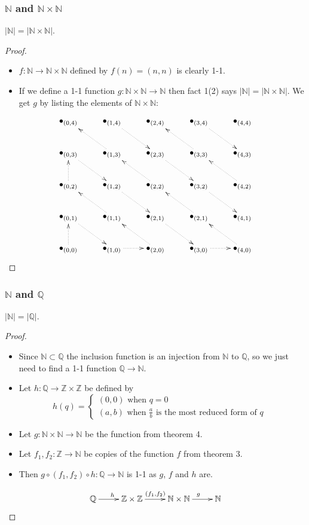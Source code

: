 \documentclass[handout]{beamer}
\newcommand{\bN}{\mathbb{N}}
\newcommand{\bZ}{\mathbb{Z}}
\newcommand{\bQ}{\mathbb{Q}}
\begin{document}
\begin{frame}
\frametitle{$\bN$ and $\bN\times \bN$}
\begin{theorem}
$|\bN|=|\bN\times\bN|$.
\end{theorem}
\begin{proof}
\begin{itemize}
\item $f:\bN\to\bN\times\bN$ defined by $f(n)=(n,n)$ is clearly 1-1. 
\item If we define a 1-1 function $g:\bN\times \bN\to \bN$ then fact 1(2) says $|\bN|=|\bN\times\bN|$. We get $g$ by listing the elements of $\bN\times \bN$: 
\end{itemize}
\xymatrixrowsep{.3cm}
\xymatrixcolsep{.3cm}
\[\xymatrix{ 
\bullet_{(0,4)} & \bullet_{(1,4)}\ar@{.>}[dr] & \bullet_{(2,4)} & \bullet_{(3,4)}\ar@{.>}[dr] & \bullet_{(4,4)}\\
\bullet_{(0,3)}\ar@{.>}[dr]  & \bullet_{(1,3)}\ar@{.>}[ul] & \bullet_{(2,3)}\ar@{.>}[dr]  & \bullet_{(3,3)}\ar@{.>}[ul] & \bullet_{(4,3)} \\
\bullet_{(0,2)}\ar@{.>}[u]  & \bullet_{(1,2)}\ar@{.>}[dr]  & \bullet_{(2,2)}\ar@{.>}[ul] & \bullet_{(3,2)}\ar@{.>}[dr]  & \bullet_{(4,2)}\ar@{.>}[ul]  \\
\bullet_{(0,1)}\ar@{.>}[dr]  & \bullet_{(1,1)}\ar@{.>}[ul]  & \bullet_{(2,1)}\ar@{.>}[dr]  & \bullet_{(2,1)}\ar@{.>}[ul] & \bullet_{(4,1)} \\
\bullet_{(0,0)}\ar@{.>}[u] & \bullet_{(1,0)}\ar@{.>}[r]  & \bullet_{(2,0)}\ar@{.>}[ul] & \bullet_{(3,0)}\ar@{.>}[r]  & \bullet_{(4,0)}\ar@{.>}[ul]  }\]
\end{proof}
\end{frame}

\begin{frame}
\frametitle{$\bN$ and $\bQ$}
\begin{corollary}
$|\bN|=|\bQ|$.
\end{corollary}
\begin{proof}
\begin{itemize}
\item Since $\bN\subset\bQ$ the inclusion function is an injection from $\bN$ to $\bQ$, so we just need to find a 1-1 function $\bQ\to\bN$. 
\item Let $h:\bQ\to\bZ\times\bZ$ be defined by 
\[h(q) = \begin{cases}
(0,0) \text{ when $q = 0$}\\
(a,b) \text{ when $\frac{a}{b}$ is the most reduced form of $q$ }
\end{cases}\]
\item Let $g:\bN\times \bN\to \bN$ be the function from theorem 4.
\item Let $f_1,f_2:\bZ\to \bN$ be copies of the function $f$ from theorem 3.  
\item Then $g\circ(f_1,f_2)\circ h:\bQ\to \bN$ is 1-1 as $g$, $f$ and $h$ are.
\end{itemize}
\[\xymatrix{\bQ\ar[r]^h & \bZ\times \bZ\ar[r]^{(f_1,f_2)} & \bN\times \bN\ar[r]^g & \bN}\]
\end{proof}
\end{frame}
\end{document}
